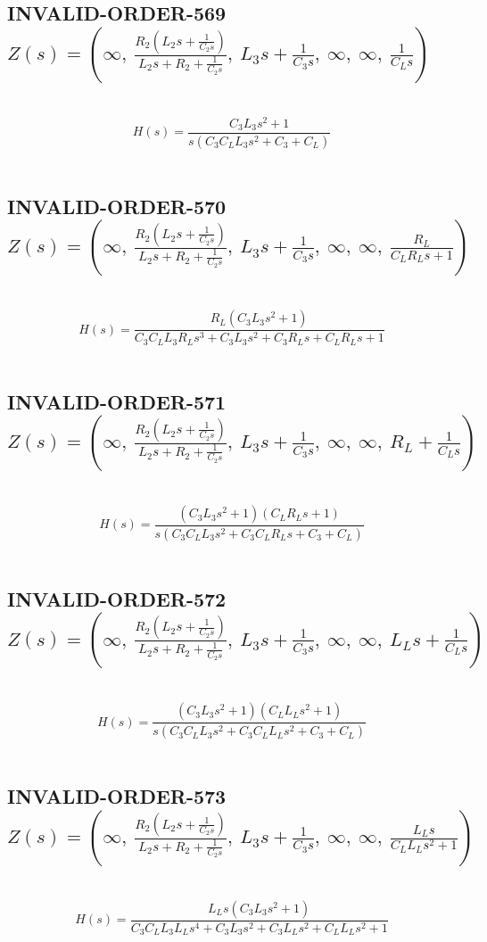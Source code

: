 \documentclass{article}
\begin{document}
\subsection{INVALID-ORDER-569 $Z(s) = \left( \infty, \  \frac{R_{2} \left(L_{2} s + \frac{1}{C_{2} s}\right)}{L_{2} s + R_{2} + \frac{1}{C_{2} s}}, \  L_{3} s + \frac{1}{C_{3} s}, \  \infty, \  \infty, \  \frac{1}{C_{L} s}\right)$ } \ 
\textbf{\[H(s) = \frac{C_{3} L_{3} s^{2} + 1}{s \left(C_{3} C_{L} L_{3} s^{2} + C_{3} + C_{L}\right)}\] } \ 
\subsection{INVALID-ORDER-570 $Z(s) = \left( \infty, \  \frac{R_{2} \left(L_{2} s + \frac{1}{C_{2} s}\right)}{L_{2} s + R_{2} + \frac{1}{C_{2} s}}, \  L_{3} s + \frac{1}{C_{3} s}, \  \infty, \  \infty, \  \frac{R_{L}}{C_{L} R_{L} s + 1}\right)$ } \ 
\textbf{\[H(s) = \frac{R_{L} \left(C_{3} L_{3} s^{2} + 1\right)}{C_{3} C_{L} L_{3} R_{L} s^{3} + C_{3} L_{3} s^{2} + C_{3} R_{L} s + C_{L} R_{L} s + 1}\] } \ 
\subsection{INVALID-ORDER-571 $Z(s) = \left( \infty, \  \frac{R_{2} \left(L_{2} s + \frac{1}{C_{2} s}\right)}{L_{2} s + R_{2} + \frac{1}{C_{2} s}}, \  L_{3} s + \frac{1}{C_{3} s}, \  \infty, \  \infty, \  R_{L} + \frac{1}{C_{L} s}\right)$ } \ 
\textbf{\[H(s) = \frac{\left(C_{3} L_{3} s^{2} + 1\right) \left(C_{L} R_{L} s + 1\right)}{s \left(C_{3} C_{L} L_{3} s^{2} + C_{3} C_{L} R_{L} s + C_{3} + C_{L}\right)}\] } \ 
\subsection{INVALID-ORDER-572 $Z(s) = \left( \infty, \  \frac{R_{2} \left(L_{2} s + \frac{1}{C_{2} s}\right)}{L_{2} s + R_{2} + \frac{1}{C_{2} s}}, \  L_{3} s + \frac{1}{C_{3} s}, \  \infty, \  \infty, \  L_{L} s + \frac{1}{C_{L} s}\right)$ } \ 
\textbf{\[H(s) = \frac{\left(C_{3} L_{3} s^{2} + 1\right) \left(C_{L} L_{L} s^{2} + 1\right)}{s \left(C_{3} C_{L} L_{3} s^{2} + C_{3} C_{L} L_{L} s^{2} + C_{3} + C_{L}\right)}\] } \ 
\subsection{INVALID-ORDER-573 $Z(s) = \left( \infty, \  \frac{R_{2} \left(L_{2} s + \frac{1}{C_{2} s}\right)}{L_{2} s + R_{2} + \frac{1}{C_{2} s}}, \  L_{3} s + \frac{1}{C_{3} s}, \  \infty, \  \infty, \  \frac{L_{L} s}{C_{L} L_{L} s^{2} + 1}\right)$ } \ 
\textbf{\[H(s) = \frac{L_{L} s \left(C_{3} L_{3} s^{2} + 1\right)}{C_{3} C_{L} L_{3} L_{L} s^{4} + C_{3} L_{3} s^{2} + C_{3} L_{L} s^{2} + C_{L} L_{L} s^{2} + 1}\] } \ 
\end{document}
